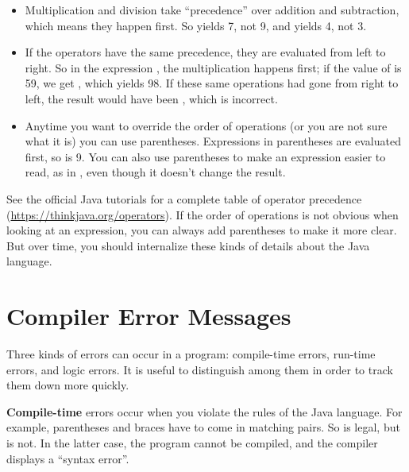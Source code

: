 \begin{itemize}

\item Multiplication and division take ``precedence'' over addition and subtraction, which means they happen first.
So  yields 7, not 9, and  yields 4, not 3.

\item If the operators have the same precedence, they are evaluated from left to right.
So in the expression , the multiplication happens first; if the value of  is 59, we get , which yields 98.
If these same operations had gone from right to left, the result would have been , which is incorrect.


\item Anytime you want to override the order of operations (or you are not sure what it is) you can use parentheses.
Expressions in parentheses are evaluated first, so  is 9.
You can also use parentheses to make an expression easier to read, as in , even though it doesn't change the result.

\end{itemize}

See the official Java tutorials for a complete table of operator precedence (\url{https://thinkjava.org/operators}).
If the order of operations is not obvious when looking at an expression, you can always add parentheses to make it more clear.
But over time, you should internalize these kinds of details about the Java language.


\section{Compiler Error Messages}


Three kinds of errors can occur in a program: compile-time errors, run-time errors, and logic errors.
It is useful to distinguish among them in order to track them down more quickly.


{\bf Compile-time} errors occur when you violate the rules of the Java language.
For example, parentheses and braces have to come in matching pairs.
So  is legal, but  is not.
In the latter case, the program cannot be compiled, and the compiler displays a ``syntax error''.

